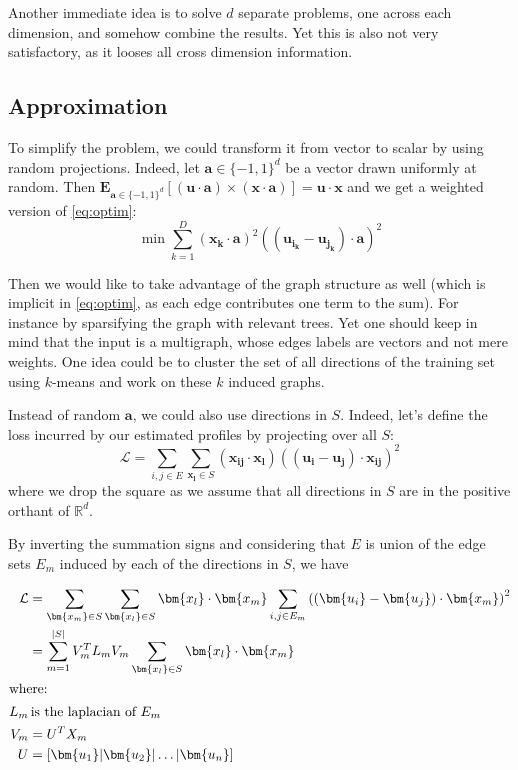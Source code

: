 Another immediate idea is to solve $d$ separate problems, one across each
dimension, and somehow combine the results. Yet this is also not very
satisfactory, as it looses all cross dimension information.

\subsection{Approximation}

To simplify the problem, we could transform it from vector to scalar by using
random projections. Indeed, let $\bm{a} \in \{-1,1\}^d$ be a vector drawn uniformly
at random. Then $\mathbf{E}_{\bm{a} \in \{-1,1\}^d}\left[(\bm{u}\cdot \bm{a})\times
(\bm{x} \cdot \bm{a})\right] = \bm{u}\cdot \bm{x}$ and we get a weighted
version of \eqref{eq:optim}:
\begin{equation*}
	\min \sum_{k=1}^D (\bm{x_k}\cdot \bm{a})^2
	\left( (\bm{u_{i_k}} - \bm{u_{j_k}} ) \cdot \bm{a} \right )^2
	\label{eq:random-optim}
\end{equation*}

Then we would like to take advantage of the graph structure as well (which is
implicit in \eqref{eq:optim}, as each edge contributes one term to the sum).
For instance by sparsifying the graph with relevant trees. Yet one should keep
in mind that the input is a multigraph, whose edges labels are vectors and not
mere weights. One idea could be to cluster the set of all directions of the
training set using $k$-means and work on these $k$ induced graphs.

Instead of random $\bm{a}$, we could also use directions in $S$. Indeed, let's
define the loss incurred by our estimated profiles by projecting over all $S$:
\begin{equation*}
	\mathcal{L} = \sum_{i,j \in E} \sum_{\bm{x_l} \in S}
	(\bm{x_{ij}}\cdot \bm{x_l}) \left( (\bm{u_i} - \bm{u_j} ) \cdot \bm{x_{ij}} \right )^2
\end{equation*}
where we drop the square as we assume that all directions in $S$ are in the
positive orthant of $\mathbb{R}^d$.

By inverting the summation signs and considering that $E$ is union of the edge
sets $E_m$ induced by each of the directions in $S$, we have

\begin{align*}
	\mathcal{L}        & = \sum_{\bm{x_m} \in S} \sum_{\bm{x_l} \in S} \bm{x_l}\cdot\bm{x_m}
	\sum_{i,j \in E_m} \left( (\bm{u_i} - \bm{u_j} ) \cdot \bm{x_m} \right )^2 \\
                       & = \sum_{m=1}^{|S|} V_m^T L_m V_m \sum_{\bm{x_l} \in S}\bm{x_l}\cdot\bm{x_m}\\
	\shortintertext{where:}
	L_m                & \, \text{is the laplacian of $E_m$} \\
	V_m                & = U^T X_m \\
	U                  & = [\bm{u_1} | \bm{u_2} | \ldots | \bm{u_n} ]
\end{align*}


